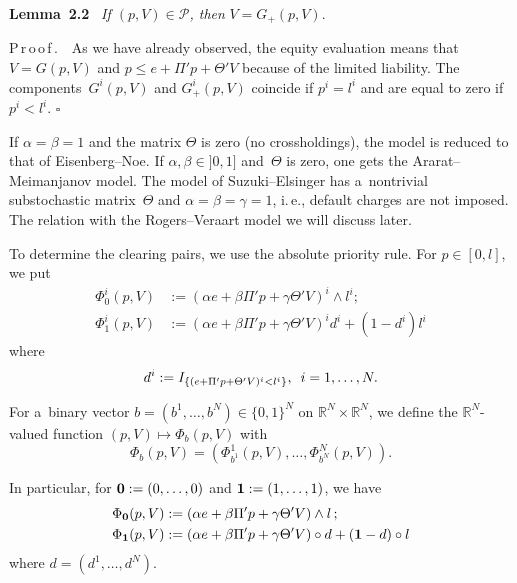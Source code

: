 \begin{multicols}{2}
\noindent
\textbf{Lemma~2.2}\ %
\textit{If $(p,V)\in\mathcal{P}$, then}
$V = G_+(p, V)$.

\smallskip

\noindent
P\,r\,o\,o\,f\,.\ \
As we have already observed, the equity evaluation means that   $V = G(p, V)$  and     
$p \le e + \Pi' p + \Theta' V$ because of the limited liability. The components~$G^i(p, V)$ and  $G^i_+(p, V)$
coincide if $p^i=l^i$ and are equal to zero if $p^i<l^i$. \hfill$\square$



\smallskip


If $\alpha=\beta=1$ and the  matrix $\Theta$ is zero (no crossholdings), the model 
is reduced to that of  Eisenberg--Noe.  If $\alpha,\beta\in ]0,1]$ and~$\Theta$ is zero,  one gets the Ararat--Meimanjanov 
model. The model of Suzuki--Elsinger has a~nontrivial substochastic matrix~$\Theta$ and  
$\alpha=\beta=\gamma=1$, i.\,e.,  default charges are not imposed. The relation with the Rogers--Veraart model we 
will discuss later. 


To determine the clearing pairs, we  use the absolute priority rule. For $p\in [0,l]$,
we put   
\begin{align*}
\Phi^i_0(p, V) & :=  \left(\alpha e+\beta \Pi' p + \gamma \Theta' V\right)^i \wedge l^i;\\
\Phi^i_1(p, V) & :=  \left(\alpha e+\beta \Pi' p + \gamma \Theta' V\right)^i d^i+ \left(1 - d^i\right)l^i
\end{align*}
where 
$$
d^i := I_{\{ (e + \Pi' p + \Theta' V)^i < l^i \}}, \enskip i=1,\dots,N. 
$$ 

For a~binary vector  $b=(b^1,\ldots ,b^N) \in \{0, 1\}^N$ 
 on $\mathbb{R}^N\times \mathbb{R}^N$, we define the $\mathbb{R}^N$-valued function  $(p,V)\mapsto \Phi_b (p, V)$ with 
$$
\Phi_b (p, V) = \left(\Phi^1_{b^1}(p, V), \dots, \Phi^N_{b^N}(p, V) \right).
$$ 

In particular, for ${\bf 0}:=(0,\ldots ,0)$ and ${\bf 1}:=(1,\ldots ,1)$, we have 
\begin{align*} 
\Phi_{\bf 0}(p, V) &:=  \left(\alpha e+\beta \Pi' p  + \gamma \Theta' V\right)\wedge l\,; \\ 
\Phi_{\bf 1}(p, V) &:= \left(\alpha e+\beta \Pi' p + \gamma \Theta' V\right)\circ d  + ({\bf 1} - d) \circ l
\end{align*} 
where $d = (d^1, \dots, d^N)$. 

 



\end{multicols}
